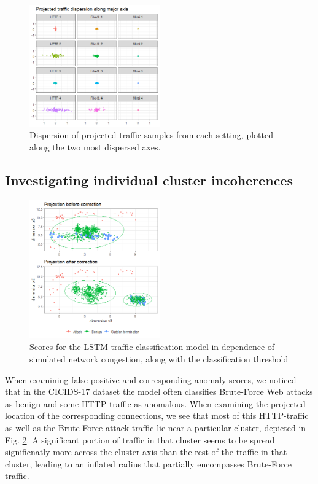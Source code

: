 \documentclass[conference]{IEEEtran}
\begin{document}
\begin{figure}
\centering
\includegraphics[width=0.5\textwidth]{images/traffic_dispersion.png}
\caption{Dispersion of projected traffic samples from each setting, plotted along the two most dispersed axes.}\label{fig:Subspace_disp}
\end{figure}



\subsection{Investigating individual cluster incoherences}

\begin{figure}
\centering
\includegraphics[width=0.5\textwidth]{images/Subspace_projection_new2.png}
\caption{Scores for the LSTM-traffic classification model in dependence of simulated network congestion, along with the classification threshold}\label{fig:Subspace_projection}
\end{figure}

When examining false-positive and corresponding anomaly scores, we noticed that in the CICIDS-17 dataset the model often classifies Brute-Force Web attacks as benign and some HTTP-traffic as anomalous. When examining the projected location of the corresponding connections, we see that most of this HTTP-traffic as well as the Brute-Force attack traffic lie near a particular cluster, depicted in Fig. \ref{fig:Subspace_projection}. A significant portion of traffic in that cluster seems to be spread significnatly more across the cluster axis than the rest of the traffic in that cluster, leading to an inflated radius that partially encompasses Brute-Force traffic. 
\end{document}
